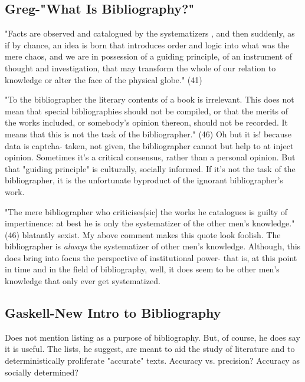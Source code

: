 \documentclass[course, english]{Notes}
\newcommand{\n}{\scalebox{2}{\textbf{\framebox{$\aleph$} } } }
\begin{document}
\subsection{Greg-"What Is Bibliography?"}
\begin{outline}
\1 "Facts are observed and catalogued by the systematizers , and then suddenly, as if by chance, an idea is born that introduces order and logic into what was the mere chaos, and we are in possession of a guiding principle, of an instrument of thought and investigation, that may transform the whole of our relation to knowledge or alter the face of the physical globe." (41)

\1 "To the bibliographer the literary contents of a book is irrelevant. This does not mean that special bibliographies should not be compiled, or that the merits of the works included, or somebody's opinion thereon, should not be recorded. It means that this is not the task of the bibliographer." (46)
	\2 \n Oh but it is! because data is captcha- taken, not given, the bibliographer cannot but help to at inject opinion. Sometimes it's a critical consensus, rather than a personal opinion. But that "guiding principle" is culturally, socially informed. If it's not the task of the bibliographer, it is the unfortunate byproduct of the ignorant bibliographer's work. 
	
\1 "The mere bibliographer who criticises[sic] the works he catalogues is guilty of impertinence: at best he is only the systematizer of the other men's knowledge." (46)
	\2 blatantly sexist. 
	\2 My above comment makes this quote look foolish. The bibliographer is \textit{always} the systematizer of other men's knowledge. Although, this does bring into focus the perspective of institutional power- that is, at this point in time and in the field of bibliography, well, it does seem to be other men's knowledge that only ever get systematized. 

\end{outline}

\subsection{Gaskell-New Intro to Bibliography}
\begin{outline}
\1 Does not mention listing as a purpose of bibliography. But, of course, he does say it is useful. The lists, he suggest, are meant to aid the study of literature and to deterministically proliferate "accurate" texts. 
	\2 Accuracy vs. precision? 
	\2 Accuracy as socially determined? 
\end{outline}
\end{document}
